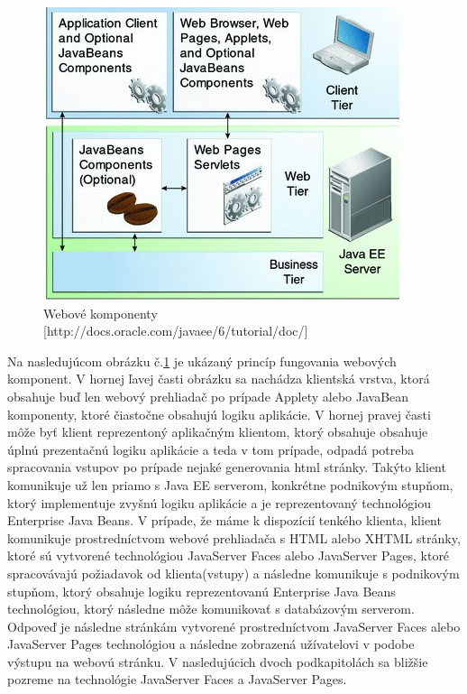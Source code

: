 \begin{figure}[htb]

\begin{center}

\includegraphics[scale=0.5]{webtechnology.jpg} 
\caption{Webové komponenty [http://docs.oracle.com/javaee/6/tutorial/doc/] }
\label{web}

\end{center}

\end{figure}
Na nasledujúcom obrázku č.\ref{web} je ukázaný princíp fungovania webových komponent. V hornej ľavej časti obrázku sa nachádza klientská vrstva, ktorá obsahuje buď len webový prehliadač po prípade Applety alebo JavaBean komponenty, ktoré čiastočne obsahujú logiku aplikácie. V hornej pravej časti môže byť klient reprezentoný aplikačným klientom, ktorý obsahuje obsahuje úplnú prezentačnú logiku aplikácie a teda v tom prípade, odpadá potreba spracovania vstupov po prípade nejaké generovania html stránky. Takýto klient komunikuje už len priamo s Java EE serverom, konkrétne podnikovým stupňom, ktorý implementuje zvyšnú logiku aplikácie a je reprezentovaný technológiou Enterprise Java Beans. V prípade, že máme k dispozícií tenkého klienta, klient komunikuje prostredníctvom webové prehliadača s HTML alebo XHTML stránky, ktoré sú vytvorené technológiou JavaServer Faces alebo JavaServer Pages, ktoré spracovávajú požiadavok od klienta(vstupy) a následne komunikuje s podnikovým stupňom, ktorý obsahuje logiku reprezentovanú Enterprise Java Beans technológiou, ktorý následne môže komunikovať s databázovým serverom. Odpoveď je následne  stránkám vytvorené prostredníctvom JavaServer Faces alebo JavaServer Pages technológiou a následne zobrazená užívatelovi v podobe výstupu na webovú stránku. V nasledujúcich dvoch podkapitolách sa bližšie pozreme na technológie JavaServer Faces a JavaServer Pages.


